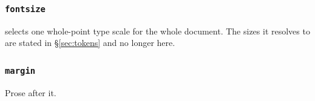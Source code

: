 %
\subsubsection{\texttt{fontsize}}
\label{sec:fontsize}

 selects one whole-point type scale for the whole document. The
sizes it resolves to are stated in \S\ref{sec:tokens} and no longer here.

\subsubsection{\texttt{margin}}

Prose after it.
